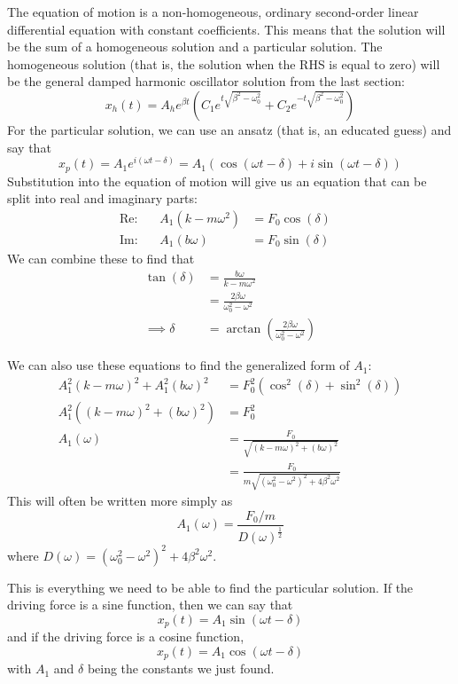 \documentclass[a4paper]{article}
\begin{document}
The equation of motion is a non-homogeneous, ordinary second-order linear
differential equation with constant coefficients. This means that the solution
will be the sum of a homogeneous solution and a particular solution. The
homogeneous solution (that is, the solution when the RHS is equal to zero)
will be the general damped harmonic oscillator solution from the last
section:
\[
	x_h(t) = A_he^{\beta t}\left(C_1e^{t\sqrt{\beta^2-\omega_0^2}} +
	C_2e^{-t\sqrt{\beta^2-\omega_0^2}}\right)
\]
For the particular solution, we can use an ansatz (that is, an educated guess)
and say that
\[
	x_p(t) = A_1e^{i(\omega t-\delta)}
	= A_1(\cos(\omega t-\delta)+i\sin(\omega t-\delta))
\]
Substitution into the equation of motion will give us an equation that can
be split into real and imaginary parts:
\begin{align*}
	\mathrm{Re:}&&A_1(k-m\omega^2)&=F_0\cos(\delta)&\\
	\mathrm{Im:}&&A_1(b\omega)&=F_0\sin(\delta)&
\end{align*}
We can combine these to find that
\begin{align*}
	\tan(\delta) &= \frac{b\omega}{k-m\omega^2}\\
		     &=\frac{2\beta\omega}{\omega_0^2-\omega^2}\\
	\implies
	\delta &= \arctan\left(\frac{2\beta\omega}{\omega_0^2-\omega^2}\right)
\end{align*}

We can also use these equations to find the generalized form of $A_1$:
\begin{align*}
	A_1^2(k-m\omega)^2+A_1^2(b\omega)^2 &=
		F_0^2(\cos^2(\delta)+\sin^2(\delta))\\
	A_1^2\left((k-m\omega)^2+(b\omega)^2\right) &= F_0^2\\
	A_1(\omega) &= \frac{F_0}{\sqrt{(k-m\omega)^2+(b\omega)^2}}\\
		    &= \frac{F_0}{m\sqrt{(\omega_0^2-\omega^2)^2+
		    	4\beta^2\omega^2}}
\end{align*}
This will often be written more simply as
\[
	A_1(\omega) = \frac{F_0/m}{D(\omega)^{\frac{1}{2}}}
\]
where $D(\omega)=(\omega_0^2-\omega^2)^2+4\beta^2\omega^2$.

This is everything we need to be able to find the particular solution.
If the driving force is a sine function, then we can say that
\[
	x_p(t) = A_1\sin(\omega t-\delta)
\]
and if the driving force is a cosine function,
\[
	x_p(t) = A_1\cos(\omega t-\delta)
\]
with $A_1$ and $\delta$ being the constants we just found.
\end{document}
